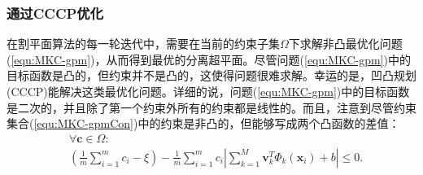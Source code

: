 \subsubsection{通过CCCP优化}
在割平面算法的每一轮迭代中，需要在当前的约束子集$\Omega$下求解非凸最优化问题(\ref{equ:MKC-gpm})，从而得到最优的分离超平面。尽管问题(\ref{equ:MKC-gpm})中的目标函数是凸的，但约束并不是凸的，这使得问题很难求解。幸运的是，凹凸规划(CCCP)能解决这类最优化问题。详细的说，问题(\ref{equ:MKC-gpm})中的目标函数是二次的，并且除了第一个约束外所有的约束都是线性的。而且，注意到尽管约束集合(\ref{equ:MKC-gpmCon})中的约束是非凸的，但能够写成两个凸函数的差值：
\begin{equation}
\begin{aligned}
& \forall \mathbf{c} \in \Omega: \\
& \left(\frac{1}{m}\sum^m_{i=1}c_i-\xi\right)-\frac{1}{m}\sum^m_{i=1}c_i\left |\sum^M_{k=1}\mathbf{v}_k^T\Phi_k(\mathbf{x}_i)+b \right | \le 0.
\end{aligned}
\end{equation}

